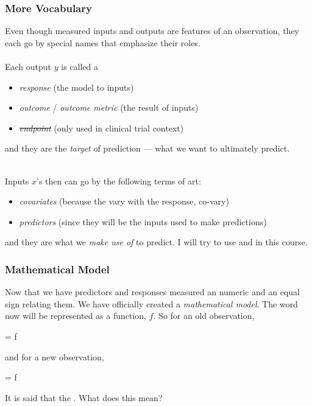 \documentclass[handout]{beamer}
\begin{document}
\begin{frame}\frametitle{More Vocabulary}

\small
Even though measured inputs and outputs are features of an observation, they each go by special names that emphasize their roles. \\~\\

Each output $y$ is called a

\begin{itemize}
\item \textit{response} (the model  to inputs)
\item \textit{outcome} / \textit{outcome metric} (the result of inputs)
\item \sout{\textit{endpoint}} (only used in clinical trial context)
\end{itemize}

and they are the \emph{target} of prediction --- what we want to ultimately predict. \\~\\ \pause 

Inputs $x$'s then can go by the following terms of art:

\begin{itemize}
\item \textit{covariates} (because the vary with the response, co-vary)
\item \textit{predictors} (since they will be the inputs used to make predictions)
\end{itemize}

and they are what we \emph{make use of} to predict. I will try to use  and  in this course.

\end{frame}


\begin{frame}\frametitle{Mathematical Model}

Now that we have predictors and responses measured an numeric and an equal sign relating them. We have officially created a \textit{mathematical model}. The word  now will be represented as a function, $f$.  \pause So for an old observation,

\beqn
{} = f 
\eeqn

and for a new observation, \pause 

\beqn
{} = f 
\eeqn

It is said that the . What does this mean?
	
\end{frame}
\end{document}
